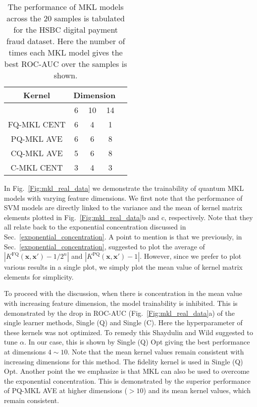 \documentclass[reprint,amsfonts, amssymb, amsmath,  showkeys, nofootinbib,pra, superscriptaddress, twocolumn,longbibliography]{revtex4-2}
\renewcommand{\vec}[1]{\boldsymbol{#1}}  %
\begin{document}
\begin{table}[!htbp]
\centering
\begin{tabular}{*5c}
\toprule
Kernel &  \multicolumn{3}{c}{Dimension} \\
\midrule
{} & 6 & 10 & 14  \\
FQ-MKL CENT & 6 & 4 & 1  \\
PQ-MKL AVE & 6 & 6 & 8  \\
CQ-MKL AVE & 5 & 6 & 8  \\
C-MKL CENT & 3 & 4 & 3  \\
\bottomrule
\end{tabular}
\caption{\label{Table:real_data_counts}
The performance of MKL models across the 20 samples is tabulated for the HSBC digital payment fraud dataset. Here the number of times each MKL model gives the best ROC-AUC over the samples is shown.}
\end{table}

In Fig.~\ref{Fig:mkl_real_data} we demonstrate the trainability of quantum MKL models with varying feature dimensions. 
We first note that the performance of SVM models are directly linked to the variance and the mean of kernel matrix elements plotted in Fig.~\ref{Fig:mkl_real_data}b and c, respectively. Note that they all relate back to the exponential concentration discussed in Sec.~\ref{exponential_concentration}.
A point to mention is that we previously, in Sec.~\ref{exponential_concentration}, suggested to plot the average of $|K^{\text{FQ}}(\vec{x},\vec{x}')-1/2^n|$ and $|K^{\text{PQ}}(\vec{x},\vec{x}')-1|$. However, since we prefer to plot various results in a single plot, we simply plot the mean value of kernel matrix elements for simplicity.

To proceed with the discussion, when there is concentration in the mean value with increasing feature dimension, the model trainability is inhibited.
This is demonstrated by the drop in ROC-AUC (Fig.~\ref{Fig:mkl_real_data}a) of the single learner methods, Single (Q) and Single (C). Here the hyperparameter of these kernels was not optimized.
To remedy this Shaydulin and Wild \cite{PhysRevA.106.042407} suggested to tune $\alpha$.
In our case, this is shown by Single (Q) Opt giving the best performance at dimensions $4\sim10$. Note that the mean kernel values remain consistent with increasing dimensions for this method. The fidelity kernel is used in Single (Q) Opt.
Another point the we emphasize is that MKL can also be used to overcome the exponential concentration. This is demonstrated by the superior performance of PQ-MKL AVE at higher dimensions ($>10$) and its mean kernel values, which remain consistent.
\end{document}
